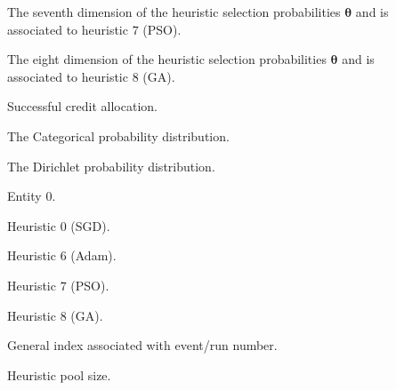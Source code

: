 \begin{description}
	\item [\parbox{2cm}{$\theta_{7}$}] \parbox{12.5cm}{The seventh dimension of the heuristic selection probabilities $\boldsymbol{\theta}$ and is associated to heuristic $7$ (\acs{PSO}).}
	\item [\parbox{2cm}{$\theta_{8}$}] \parbox{12.5cm}{The eight dimension of the heuristic selection probabilities $\boldsymbol{\theta}$ and is associated to heuristic $8$ (\acs{GA}).}
	\item [\parbox{2cm}{$c_{1}$}] \parbox{12.5cm}{Successful credit allocation.}
	\item [\parbox{2cm}{$Cat$}] \parbox{12.5cm}{The Categorical probability distribution.}
	\item [\parbox{2cm}{$Dir$}] \parbox{12.5cm}{The Dirichlet probability distribution.}
	\item [\parbox{2cm}{$e_{0}$}] \parbox{12.5cm}{Entity $0$.}
	\item [\parbox{2cm}{$h_{0}$}] \parbox{12.5cm}{Heuristic $0$ (\acs{SGD}).}
	\item [\parbox{2cm}{$h_{6}$}] \parbox{12.5cm}{Heuristic $6$ (\acs{Adam}).}
	\item [\parbox{2cm}{$h_{7}$}] \parbox{12.5cm}{Heuristic $7$ (\acs{PSO}).}
	\item [\parbox{2cm}{$h_{8}$}] \parbox{12.5cm}{Heuristic $8$ (\acs{GA}).}
	\item [\parbox{2cm}{$i$}] \parbox{12.5cm}{General index associated with event/run number.}
	\item [\parbox{2cm}{$K$}] \parbox{12.5cm}{Heuristic pool size.}
\end{description}
